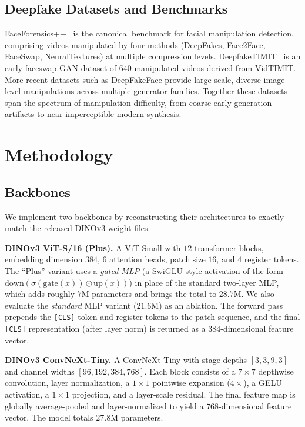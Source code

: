 \documentclass[11pt,a4paper]{article}
\begin{document}
\subsection{Deepfake Datasets and Benchmarks}
FaceForensics++~\cite{rossler2019faceforensics} is the canonical benchmark for facial
manipulation detection, comprising videos manipulated by four methods (DeepFakes, Face2Face,
FaceSwap, NeuralTextures) at multiple compression levels. DeepfakeTIMIT~\cite{korshunov2018deepfakes}
is an early faceswap-GAN dataset of $640$ manipulated videos derived from VidTIMIT. More recent
datasets such as DeepFakeFace provide large-scale, diverse image-level manipulations across
multiple generator families. Together these datasets span the spectrum of manipulation difficulty,
from coarse early-generation artifacts to near-imperceptible modern synthesis.

\section{Methodology}

\subsection{Backbones}
We implement two backbones by reconstructing their architectures to exactly match the released
\textsc{DINOv3} weight files.

\textbf{DINOv3 ViT-S/16 (Plus).} A ViT-Small with $12$ transformer blocks, embedding dimension
$384$, $6$ attention heads, patch size $16$, and $4$ register tokens. The ``Plus'' variant uses a
\emph{gated MLP} (a SwiGLU-style activation of the form $\text{down}(\sigma(\text{gate}(x)) \odot
\text{up}(x))$) in place of the standard two-layer MLP, which adds roughly $7$M parameters and
brings the total to $28.7$M. We also evaluate the \emph{standard} MLP variant ($21.6$M) as an
ablation. The forward pass prepends the \texttt{[CLS]} token and register tokens to the patch
sequence, and the final \texttt{[CLS]} representation (after layer norm) is returned as a
$384$-dimensional feature vector.

\textbf{DINOv3 ConvNeXt-Tiny.} A ConvNeXt-Tiny with stage depths $[3,3,9,3]$ and channel widths
$[96,192,384,768]$. Each block consists of a $7\times7$ depthwise convolution, layer normalization,
a $1\times1$ pointwise expansion ($4\times$), a GELU activation, a $1\times1$ projection, and a
layer-scale residual. The final feature map is globally average-pooled and layer-normalized to
yield a $768$-dimensional feature vector. The model totals $27.8$M parameters.
\end{document}
